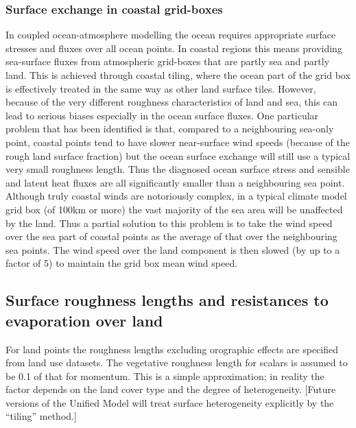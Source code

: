 \documentclass{UMDP_article}
\begin{document}
\subsubsection{Surface exchange in coastal grid-boxes}
\label{sec:coast}

In coupled ocean-atmosphere modelling the ocean requires appropriate
surface stresses and fluxes over all ocean points.  In coastal regions
this means providing sea-surface fluxes from atmospheric grid-boxes
that are partly sea and partly land.  This is achieved through coastal
tiling, where the ocean part of the grid box is effectively treated in
the same way as other land surface tiles.  However, because of the
very different roughness characteristics of land and sea, this can
lead to serious biases especially in the ocean surface fluxes.  One
particular problem that has been identified is that, compared to a
neighbouring sea-only point, coastal points tend to have slower
near-surface wind speeds (because of the rough land surface fraction)
but the ocean surface exchange will still use a typical very small
roughness length.  Thus the diagnosed ocean surface stress and
sensible and latent heat fluxes are all significantly smaller than a
neighbouring sea point.  Although truly coastal winds are notoriously
complex, in a typical climate model grid box (of 100km or more) the
vast majority of the sea area will be unaffected by the land.  Thus a
partial solution to this problem is to take the wind speed over the
sea part of coastal points as the average of that over the
neighbouring sea points.  The wind speed over the land component is
then slowed (by up to a factor of 5) to maintain the grid box mean
wind speed.

\subsection{Surface roughness lengths and resistances to evaporation
  over land}\label{section_1.7}
For land points the roughness lengths excluding orographic effects are
specified from land use datasets. The vegetative roughness length for
scalars is assumed to be 0.1 of that for momentum. This is a simple
approximation; in reality the factor depends on the land cover type
and the degree of heterogeneity. [Future versions of the Unified Model
will treat surface heterogeneity explicitly by the ``tiling'' method.]
\end{document}
